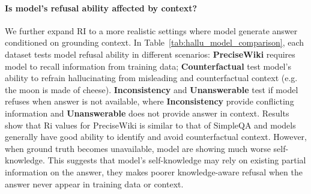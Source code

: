 \documentclass{article} %
\theoremstyle{definition}
\begin{document}
\begin{table}
    \vspace{-\baselineskip}
    \centering
    \caption{Refusal Index results on hallucination benchmarks.}
    \label{tab:hallu_model_comparison}
    \vspace{-1.5em}

\end{table}

\paragraph{Is model's refusal ability affected by context?} 
We further expand RI to a more realistic settings where model generate answer conditioned on grounding context. 
In Table~\ref{tab:hallu_model_comparison}, each dataset tests model refusal ability in different scenarios:
\textbf{PreciseWiki} requires model to recall information from training data; 
\textbf{Counterfactual} test model's ability to refrain hallucinating from misleading and counterfactual context (e.g. the moon is made of cheese). 
\textbf{Inconsistency} and \textbf{Unanswerable} test if model refuses when answer is not available, where \textbf{Inconsistency} provide conflicting information and \textbf{Unanswerable} does not provide answer in context.
Results show that Ri values for PreciseWiki is similar to that of SimpleQA and models generally have good ability to identify and avoid counterfactual context. However, when ground truth becomes unavailable, model are showing much worse self-knowledge. 
This suggests that model's self-knowledge may rely on existing partial information on the answer, they makes poorer knowledge-aware refusal when the answer never appear in training data or context.
\end{document}
